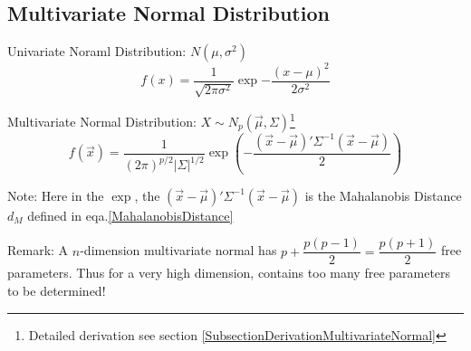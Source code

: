 \subsection{Multivariate Normal Distribution}
    Univariate Noraml Distribution: $ N(\mu,\sigma^2) $
    \[
        f(x)=\dfrac{1}{\sqrt{2\pi\sigma ^2}}\exp{-\dfrac{(x-\mu)^2}{2\sigma ^2}} 
    \]
    
    Multivariate Normal Distribution: $X\sim N_p(\vec{\mu},\Sigma) $\footnote{Detailed derivation see section \ref{SubsectionDerivationMultivariateNormal}}
    \[
        f(\vec{x})=\dfrac{1}{(2\pi)^{p/2}|\Sigma |^{1/2}}\exp\left({-\dfrac{(\vec{x}-\vec{\mu})'\Sigma^{-1}(\vec{x}-\vec{\mu})}{2}} \right)
    \]

    Note: Here in the $ \exp $, the $ (\vec{x}-\vec{\mu})'\Sigma^{-1}(\vec{x}-\vec{\mu}) $ is the Mahalanobis Distance $ d_M $ defined in eqa.\ref{MahalanobisDistance}

    
    

    Remark: A $ n $-dimension multivariate normal has $ p+\dfrac{p(p-1)}{2}=\dfrac{p(p+1)}{2} $ free parameters. Thus for a very high dimension, contains too many free parameters to be determined! 
    
